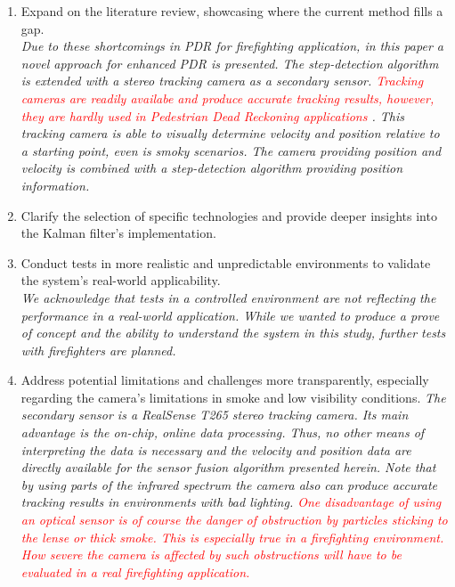 \documentclass{article}
\begin{document}
\begin{enumerate}
\item Expand on the literature review, showcasing where the current method fills a gap.\\
\textit{Due to these shortcomings in PDR for firefighting application, in this paper  a novel approach for enhanced PDR is presented. The step-detection algorithm is extended with a stereo tracking camera as a secondary sensor. \textcolor{red}{Tracking cameras are readily availabe and produce accurate tracking results, however, they are hardly used in Pedestrian Dead Reckoning applications \cite{hou2021}}. This tracking camera is able to visually determine velocity and position relative to a starting point, even is smoky scenarios. The camera providing position and velocity is combined with a step-detection algorithm providing position information.}

\item Clarify the selection of specific technologies and provide deeper insights into the Kalman filter's implementation.

\item Conduct tests in more realistic and unpredictable environments to validate the system's real-world applicability.\\
\textit{We acknowledge that tests in a controlled environment are not reflecting the performance in a real-world application. While we wanted to produce a prove of concept and the ability to understand the system  in this study, further tests with firefighters are planned.}\\

\item Address potential limitations and challenges more transparently, especially regarding the camera's limitations in smoke and low visibility conditions.
\textit{The secondary sensor is a RealSense T265 stereo tracking camera. Its main advantage is the on-chip, online data processing. Thus, no other means of interpreting the data is necessary and the velocity and position data are directly available for the sensor  fusion algorithm presented herein. Note that by using parts of the infrared spectrum the camera also can produce accurate tracking results in environments with bad lighting. \textcolor{red}{One disadvantage of using an optical sensor is of course the danger of obstruction by particles sticking to the lense or thick smoke. This is especially true in a firefighting environment. How severe the camera is affected by such obstructions will have to be evaluated in a real firefighting application.}}


\end{enumerate}
\end{document}

